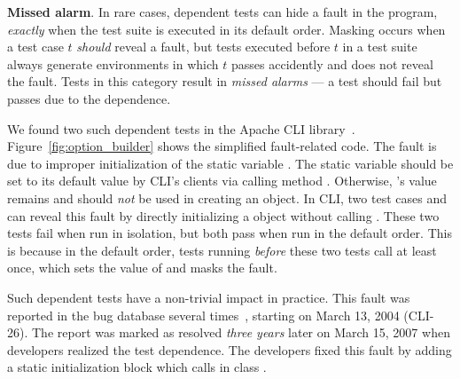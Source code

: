 \vspace{1mm}

\noindent \textbf{Missed alarm}. In rare cases,
dependent tests can hide a fault in the
program, \emph{exactly} when the test suite is executed in its default
order. Masking occurs when a test case $t$ \emph{should}
reveal a fault, but tests executed before $t$ in a test suite always
generate environments in which $t$ passes accidently and
does not reveal the fault. 
Tests in this category result in \textit{missed alarms} ---
a test should fail but passes due to the dependence.




We found two such dependent tests in
the Apache CLI library~\cite{cli, DBLP:conf/sigsoft/MusluSW11}.
Figure~\ref{fig:option_builder} shows the simplified fault-related
code. The fault is due to improper initialization of the static variable
. The static variable  should be set
to its default value  by CLI's clients via calling
method . Otherwise, 's
value remains  and should \emph{not} be
used in creating an  object.
In CLI, two test cases 
 and 
can reveal this fault by directly initializing
a  object without calling .
These two tests fail when run in isolation,
but both pass when run in the default order. This is because
in the default order, tests running \emph{before} these
two tests call  at least once, which sets
the value of  and masks the fault.


Such dependent tests have a non-trivial impact in practice.
This fault was reported in the bug database several times~\cite{clibug},
starting on March 13, 2004 (CLI-26). The report was marked as resolved
\emph{three years} later on March 15, 2007 when developers
realized the test dependence. The developers fixed this
fault by adding a static initialization block which
calls  in class .

